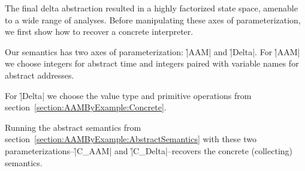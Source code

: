 The final delta abstraction resulted in a highly factorized state space,
amenable to a wide range of analyses.
%
Before manipulating these axes of parameterization, we first show how to
recover a concrete interpreter.


Our semantics has two axes of parameterization: \h|AAM| and \h|Delta|.
%
For \h|AAM| we choose integers for abstract time and integers paired with
variable names for abstract addresses.
%


For \h|Delta| we choose the value type and primitive operations from
section~\ref{section:AAMByExample:Concrete}.
%


Running the abstract semantics from
section~\ref{section:AAMByExample:AbstractSemantics} with these two
parameterizations--\h|C_AAM| and \h|C_Delta|--recovers the concrete
(collecting) semantics.
%
